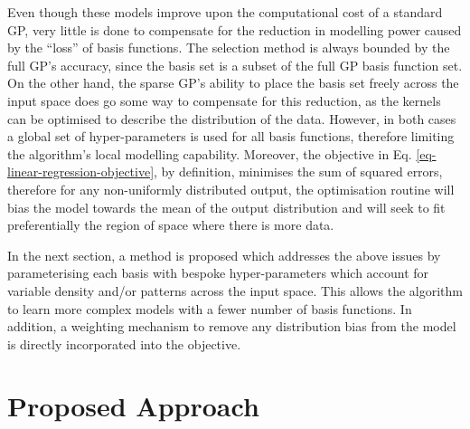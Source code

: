 \documentclass[useAMS,usenatbib,fleqn]{mn2e}
\begin{document}
Even though these models improve upon the computational cost of a standard GP, very little is done to compensate for the reduction in modelling power caused by the ``loss'' of basis functions. The selection method is always bounded by the full GP's accuracy, since the basis set is a subset of the full GP basis function set. On the other hand, the sparse GP's ability to place the basis set freely across the input space does go some way to compensate for this reduction, as the kernels can be optimised to describe the distribution of the data. However, in both cases a global set of hyper-parameters is used for all basis functions, therefore limiting the algorithm's local modelling capability. Moreover, the objective in Eq. \eqref{eq-linear-regression-objective}, by definition, minimises the sum of squared errors, therefore for any non-uniformly distributed output, the optimisation routine will bias the model towards the mean of the output distribution and will seek to fit preferentially the region of space where there is more data.

In the next section, a method is proposed which addresses the above issues by parameterising each basis with bespoke hyper-parameters which account for variable density and/or patterns across the input space. This allows the algorithm to learn more complex models with a fewer number of basis functions. In addition, a weighting mechanism to remove any distribution bias from the model is directly incorporated into the objective.

\section{Proposed Approach}
\label{sec-proposed-approach}
\end{document}
